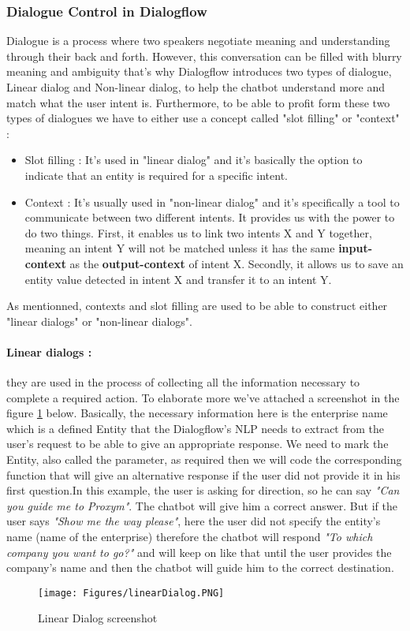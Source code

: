 \subsubsection{Dialogue Control in Dialogflow}
Dialogue is a process where two speakers negotiate meaning and understanding through their back and forth. However, this conversation can be filled with blurry meaning and ambiguity that's why Dialogflow introduces two types of dialogue, Linear dialog and Non-linear dialog, to help the chatbot understand more and match what the user intent is. Furthermore, to be able to profit form these two types of dialogues we have to either use a concept called "slot filling" or "context" : 
\begin{itemize}
    \item Slot filling : It's used in "linear dialog" and it's basically the option to indicate that an entity is required for a specific intent.
    \item Context : It's usually used in "non-linear dialog" and it's specifically a tool to communicate between two different intents. It provides us with the power to do two things. First, it enables us to link two intents X and Y together, meaning an intent Y will not be matched unless it has the same \textbf{input-context} as the \textbf{output-context} of intent X. Secondly, it allows us to save an entity value detected in intent X and transfer it to an intent Y. 
\end{itemize}
As mentionned, contexts and slot filling are used to be able to construct either "linear dialogs" or "non-linear dialogs".
\paragraph{\textbf{Linear dialogs :}} they are used in the process of collecting all the information necessary to complete a required action. To elaborate more we've attached a screenshot in the figure \ref{fig:linear dialog} below. Basically, the necessary information here is the enterprise name which is a defined Entity that the Dialogflow's NLP needs to extract from the user's request to be able to give an appropriate response. We need to mark the Entity, also called the parameter, as required then we will code the corresponding function that will give an alternative response if the user did not provide it in his first question.\newline In this example, the user is asking for direction, so he can say \textit{"Can you guide me to Proxym"}. The chatbot will give him a correct answer. But if the user says \textit{"Show me the way please"}, here the user did not specify the entity's name (name of the enterprise) therefore the chatbot will respond \textit{"To which company you want to go?"} and will keep on like that until the user provides the company's name and then the chatbot will guide him to the correct destination.
\newline
\begin{figure}[H]
\centering
\texttt{[image: Figures/linearDialog.PNG]}
\caption{Linear Dialog screenshot}
\label{fig:linear dialog}
\end{figure}
